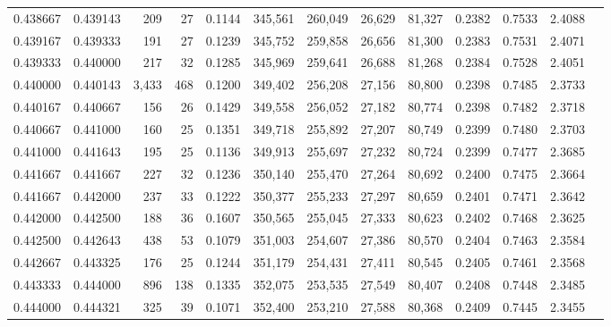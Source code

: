 \begin{tabular}{rrrrrrrrrrrrr}
0.438667 & 0.439143 &   209 &  27 &                                     0.1144 & 345,561 & 260,049 &  26,629 &  81,327 & 0.2382 & 0.7533 & 2.4088 \\
0.439167 & 0.439333 &   191 &  27 &                                     0.1239 & 345,752 & 259,858 &  26,656 &  81,300 & 0.2383 & 0.7531 & 2.4071 \\
0.439333 & 0.440000 &   217 &  32 &                                     0.1285 & 345,969 & 259,641 &  26,688 &  81,268 & 0.2384 & 0.7528 & 2.4051 \\
0.440000 & 0.440143 & 3,433 & 468 &                                     0.1200 & 349,402 & 256,208 &  27,156 &  80,800 & 0.2398 & 0.7485 & 2.3733 \\
0.440167 & 0.440667 &   156 &  26 &                                     0.1429 & 349,558 & 256,052 &  27,182 &  80,774 & 0.2398 & 0.7482 & 2.3718 \\
0.440667 & 0.441000 &   160 &  25 &                                     0.1351 & 349,718 & 255,892 &  27,207 &  80,749 & 0.2399 & 0.7480 & 2.3703 \\
0.441000 & 0.441643 &   195 &  25 &                                     0.1136 & 349,913 & 255,697 &  27,232 &  80,724 & 0.2399 & 0.7477 & 2.3685 \\
0.441667 & 0.441667 &   227 &  32 &                                     0.1236 & 350,140 & 255,470 &  27,264 &  80,692 & 0.2400 & 0.7475 & 2.3664 \\
0.441667 & 0.442000 &   237 &  33 &                                     0.1222 & 350,377 & 255,233 &  27,297 &  80,659 & 0.2401 & 0.7471 & 2.3642 \\
0.442000 & 0.442500 &   188 &  36 &                                     0.1607 & 350,565 & 255,045 &  27,333 &  80,623 & 0.2402 & 0.7468 & 2.3625 \\
0.442500 & 0.442643 &   438 &  53 &                                     0.1079 & 351,003 & 254,607 &  27,386 &  80,570 & 0.2404 & 0.7463 & 2.3584 \\
0.442667 & 0.443325 &   176 &  25 &                                     0.1244 & 351,179 & 254,431 &  27,411 &  80,545 & 0.2405 & 0.7461 & 2.3568 \\
0.443333 & 0.444000 &   896 & 138 &                                     0.1335 & 352,075 & 253,535 &  27,549 &  80,407 & 0.2408 & 0.7448 & 2.3485 \\
0.444000 & 0.444321 &   325 &  39 &                                     0.1071 & 352,400 & 253,210 &  27,588 &  80,368 & 0.2409 & 0.7445 & 2.3455 \\

\end{tabular}
